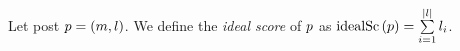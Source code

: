 \begin{definition}
  Let post $p = \left(m, l\right)$. We define the \emph{ideal score} of
  $p$ as $\mathrm{idealSc}\left(p\right) = \sum\limits_{i = 1}^{|l|} l_i$.
\end{definition}

